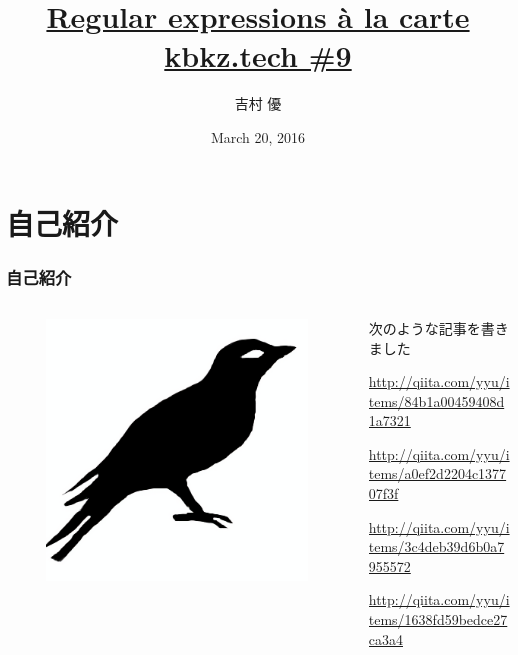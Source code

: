 \documentclass[12pt, unicode, svgnames]{beamer}
\title[Regular expressions à la carte]{%
  \href{https://github.com/y-yu/regex-slide}{Regular expressions à la carte} \\
  \href{http://kbkz.connpass.com/event/26677/}{\normalsize kbkz.tech \#9}
}
\author{吉村 優}
\date{March 20, 2016}
\institute[\url{https://twitter.com/\_yyu\_}]{%
  \url{https://twitter.com/\_yyu\_}\\
  \url{http://qiita.com/yyu}\\
  \url{https://github.com/y-yu}\\
}
\begin{document}
\frame{\maketitle}

\section{自己紹介}
\begin{frame}[fragile]
  \frametitle{自己紹介}
  
  \begin{columns}
    \begin{column}{0.25\textwidth}
      \centering
      \begin{figure}
        \includegraphics[width=\textwidth]{img/bird2x.png}
      \end{figure}
    \end{column}
    \begin{column}{0.75\textwidth}
      次のような記事を書きました
      \begin{Ldescription}
        \item<2->[VM型の正規表現エンジンを実装する]
          \small
          \url{http://qiita.com/yyu/items/84b1a00459408d1a7321}
        \item<3->[正規表現からLLVMへのコンパイラを実装する]
          \small
          \url{http://qiita.com/yyu/items/a0ef2d2204c137707f3f}
        \item<4->[正規表現のJITコンパイラを実装する]
          \small
          \url{http://qiita.com/yyu/items/3c4deb39d6b0a7955572}
        \item<5->[正規表現の微分でサブマッチング]
          \small
          \url{http://qiita.com/yyu/items/1638fd59bedce27ca3a4}
      \end{Ldescription}
    \end{column}
  \end{columns}
\end{frame}
\end{document}

